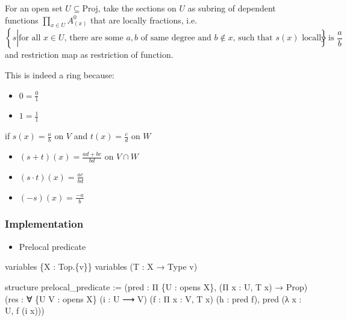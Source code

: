 \documentclass[11pt]{article}
\providecommand{\tightlist}{%
      \setlength{\itemsep}{0pt}\setlength{\parskip}{0pt}}
\newenvironment{Shaded}{}{}
\newcommand{\NormalTok}[1]{{#1}}
\begin{document}
For an open set \(U\subseteq\mathrm{Proj}\), take the sections on \(U\)
as subring of dependent functions \(\prod_{x\in U}A^0_{(x)}\) that are
locally fractions, i.e. \[
\left\{s\left|\text{for all $x\in U$, there are some $a, b$ of same degree and $b\not\in x$, such that $s(x)$ locally is $\frac a b$}\right.\right\}
\] and restriction map as restriction of function.

    This is indeed a ring because:

    \begin{itemize}
\tightlist
\item
  \(0=\frac01\)
\end{itemize}

    \begin{itemize}
\tightlist
\item
  \(1=\frac11\)
\end{itemize}

    if \(s(x)=\frac a b\) on \(V\) and \(t(x)=\frac c d\) on \(W\)

    \begin{itemize}
\tightlist
\item
  \((s+t)(x)=\frac{ad+bc}{bd}\) on \(V\cap W\)
\end{itemize}

    \begin{itemize}
\tightlist
\item
  \((s\cdot t)(x)=\frac{ac}{bd}\)
\end{itemize}

    \begin{itemize}
\tightlist
\item
  \((-s)(x)=\frac{-a}{b}\)
\end{itemize}

    \hypertarget{implementation}{%
\subsubsection{Implementation}\label{implementation}}

\begin{itemize}
\tightlist
\item
  Prelocal predicate
\end{itemize}

\begin{Shaded}
\begin{Highlighting}[]
\NormalTok{variables \{X : Top.\{v\}\}}
\NormalTok{variables (T : X → Type v)}

\NormalTok{structure prelocal\_predicate :=}
\NormalTok{(pred : Π \{U : opens X\}, (Π x : U, T x) → Prop)}
\NormalTok{(res : ∀ \{U V : opens X\} (i : U ⟶ V) (f : Π x : V, T x) }
\NormalTok{    (h : pred f), pred (λ x : U, f (i x)))}
\end{Highlighting}
\end{Shaded}
\end{document}
